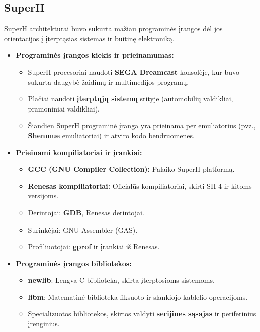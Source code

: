 \documentclass{article}
\begin{document}
\subsection{SuperH}
SuperH architektūrai buvo sukurta mažiau programinės įrangos dėl jos orientacijos į įterptąsias sistemas ir buitinę elektroniką.

\begin{itemize}
    \item \textbf{Programinės įrangos kiekis ir prieinamumas:}
        \begin{itemize}
            \item SuperH procesoriai naudoti \textbf{SEGA Dreamcast} konsolėje, kur buvo sukurta daugybė žaidimų ir multimedijos programų.
            \item Plačiai naudoti \textbf{įterptųjų sistemų} srityje (automobilių valdikliai, pramoniniai valdikliai).
            \item Šiandien SuperH programinė įranga yra prieinama per emuliatorius (pvz., \textbf{Shenmue} emuliatoriai) ir atviro kodo bendruomenes.
        \end{itemize}
    \item \textbf{Prieinami kompiliatoriai ir įrankiai:}
        \begin{itemize}
            \item \textbf{GCC (GNU Compiler Collection):} Palaiko SuperH platformą.
            \item \textbf{Renesas kompiliatoriai:} Oficialūs kompiliatoriai, skirti SH-4 ir kitoms versijoms.
            \item Derintojai: \textbf{GDB}, Renesas derintojai.
            \item Surinkėjai: GNU Assembler (GAS).
            \item Profiliuotojai: \textbf{gprof} ir įrankiai iš Renesas.
        \end{itemize}
    \item \textbf{Programinės įrangos bibliotekos:}
        \begin{itemize}
            \item \textbf{newlib}: Lengva C biblioteka, skirta įterptosioms sistemoms.
            \item \textbf{libm}: Matematinė biblioteka fiksuoto ir slankiojo kablelio operacijoms.
            \item Specializuotos bibliotekos, skirtos valdyti \textbf{serijines sąsajas} ir periferinius įrenginius.
        \end{itemize}
\end{itemize}
\end{document}
